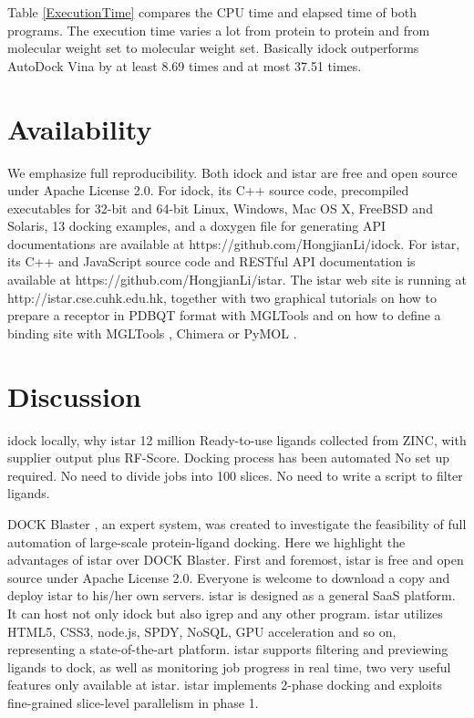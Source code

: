 \documentclass[10pt]{article}
\begin{document}
Table \ref{ExecutionTime} compares the CPU time and elapsed time of both programs. The execution time varies a lot from protein to protein and from molecular weight set to molecular weight set. Basically idock outperforms AutoDock Vina by at least 8.69 times and at most 37.51 times.


\section*{Availability}
We emphasize full reproducibility. Both idock and istar are free and open source under Apache License 2.0. For idock, its C++ source code, precompiled executables for 32-bit and 64-bit Linux, Windows, Mac OS X, FreeBSD and Solaris, 13 docking examples, and a doxygen file for generating API documentations are available at https://github.com/HongjianLi/idock. For istar, its C++ and JavaScript source code and RESTful API documentation is available at https://github.com/HongjianLi/istar. The istar web site is running at http://istar.cse.cuhk.edu.hk, together with two graphical tutorials on how to prepare a receptor in PDBQT format with MGLTools \cite{596} and on how to define a binding site with MGLTools \cite{596}, Chimera \cite{1219} or PyMOL \cite{1221}.

\section*{Discussion}

idock locally, why istar
12 million Ready-to-use ligands collected from ZINC, with supplier output plus RF-Score. Docking process has been automated
No set up required. No need to divide jobs into 100 slices. No need to write a script to filter ligands.

DOCK Blaster \cite{557}, an expert system, was created to investigate the feasibility of full automation of large-scale protein-ligand docking. Here we highlight the advantages of istar over DOCK Blaster. First and foremost, istar is free and open source under Apache License 2.0. Everyone is welcome to download a copy and deploy istar to his/her own servers. istar is designed as a general SaaS platform. It can host not only idock but also igrep and any other program. istar utilizes HTML5, CSS3, node.js, SPDY, NoSQL, GPU acceleration and so on, representing a state-of-the-art platform. istar supports filtering and previewing ligands to dock, as well as monitoring job progress in real time, two very useful features only available at istar. istar implements 2-phase docking and exploits fine-grained slice-level parallelism in phase 1.
\end{document}
